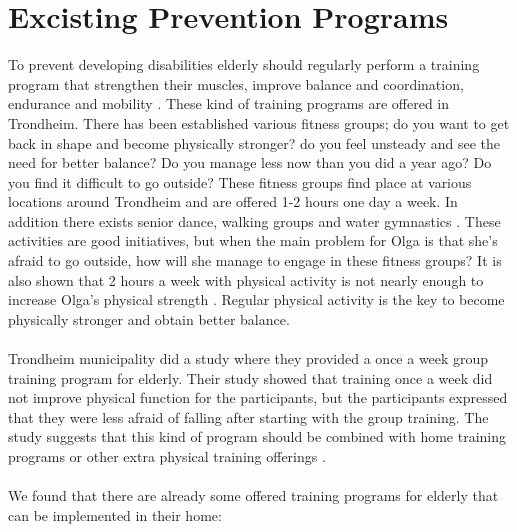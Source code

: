\section{Excisting Prevention Programs}
To prevent developing disabilities elderly should regularly perform a training program that strengthen their muscles, improve balance and coordination, endurance and mobility \cite{gruppetrening-trheim}. These kind of training programs are offered in Trondheim. There has been established various fitness groups; do you want to get back in shape and become physically stronger? do you feel unsteady and see the need for better balance? Do you manage less now than you did a year ago? Do you find it difficult to go outside? These fitness groups find place at various locations around Trondheim and are offered 1-2 hours one day a week. In addition there exists senior dance, walking groups and water gymnastics \cite{trim}. These activities are good initiatives, but when the main problem for Olga is that she's afraid to go outside, how will she manage to engage in these fitness groups? It is also shown that 2 hours a week with physical activity is not nearly enough to increase Olga’s physical strength \cite{gruppetrening-trheim}. Regular physical activity is the key to become physically stronger and obtain better balance. \\ \\
Trondheim municipality did a study where they provided a once a week group training program for elderly. Their study showed that training once a week did not improve physical function for the participants, but the participants expressed that they were less afraid of falling after starting with the group training. The study suggests that this kind of program should be combined with home training programs or other extra physical training offerings \cite{gruppetrening-trheim}. \\ \\
We found that there are already some offered training programs for elderly that can be implemented in their home:\\ \\
